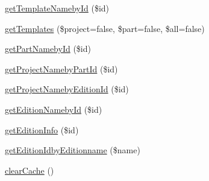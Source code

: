 \begin{DoxyCompactItemize}
\item 
\hyperlink{classrokfor___d_b_acba2b0706f7f29dd2b203fc19023f6a9}{get\-Template\-Nameby\-Id} (\$id)
\item 
\hyperlink{classrokfor___d_b_a6ef88e1ad5c4466c97f23cbbd9326712}{get\-Templates} (\$project=false, \$part=false, \$all=false)
\item 
\hyperlink{classrokfor___d_b_a7c8cc6e3421f4cc81da51d3f65d4ba62}{get\-Part\-Nameby\-Id} (\$id)
\item 
\hyperlink{classrokfor___d_b_ad78efd3b3471743ca584c621d633b860}{get\-Project\-Nameby\-Part\-Id} (\$id)
\item 
\hyperlink{classrokfor___d_b_a7c06a6c19756825c936ad4cf76753a65}{get\-Project\-Nameby\-Edition\-Id} (\$id)
\item 
\hyperlink{classrokfor___d_b_a2b5fad4213a74f13c33998dda781eee3}{get\-Edition\-Nameby\-Id} (\$id)
\item 
\hyperlink{classrokfor___d_b_a281703aa27a5b6138c2ed08e9a80c444}{get\-Edition\-Info} (\$id)
\item 
\hyperlink{classrokfor___d_b_a5b571190b5c767a3249932078278f935}{get\-Edition\-Idby\-Editionname} (\$name)
\item 
\hyperlink{classrokfor___d_b_ac01828cae86291d0bc8a78b24de6089f}{clear\-Cache} ()
\end{DoxyCompactItemize}
